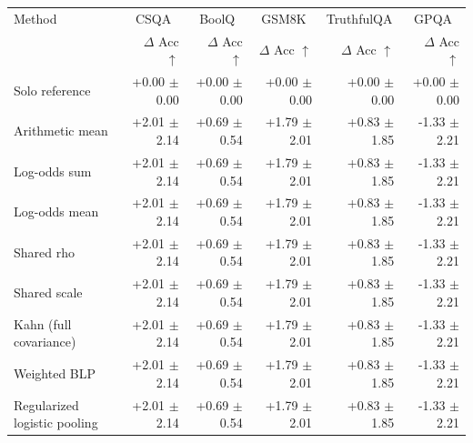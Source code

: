 \begin{tabular}{lrrrrr}
\toprule
Method & \multicolumn{1}{c}{CSQA} & \multicolumn{1}{c}{BoolQ} & \multicolumn{1}{c}{GSM8K} & \multicolumn{1}{c}{TruthfulQA} & \multicolumn{1}{c}{GPQA} \\
 & $\Delta$ Acc $\uparrow$ & $\Delta$ Acc $\uparrow$ & $\Delta$ Acc $\uparrow$ & $\Delta$ Acc $\uparrow$ & $\Delta$ Acc $\uparrow$ \\
\midrule
Solo reference & +0.00 {\scriptsize $\pm$ 0.00} & +0.00 {\scriptsize $\pm$ 0.00} & +0.00 {\scriptsize $\pm$ 0.00} & +0.00 {\scriptsize $\pm$ 0.00} & +0.00 {\scriptsize $\pm$ 0.00} \\
Arithmetic mean & +2.01 {\scriptsize $\pm$ 2.14} & +0.69 {\scriptsize $\pm$ 0.54} & +1.79 {\scriptsize $\pm$ 2.01} & +0.83 {\scriptsize $\pm$ 1.85} & -1.33 {\scriptsize $\pm$ 2.21} \\
Log-odds sum & +2.01 {\scriptsize $\pm$ 2.14} & +0.69 {\scriptsize $\pm$ 0.54} & +1.79 {\scriptsize $\pm$ 2.01} & +0.83 {\scriptsize $\pm$ 1.85} & -1.33 {\scriptsize $\pm$ 2.21} \\
Log-odds mean & +2.01 {\scriptsize $\pm$ 2.14} & +0.69 {\scriptsize $\pm$ 0.54} & +1.79 {\scriptsize $\pm$ 2.01} & +0.83 {\scriptsize $\pm$ 1.85} & -1.33 {\scriptsize $\pm$ 2.21} \\
Shared rho & +2.01 {\scriptsize $\pm$ 2.14} & +0.69 {\scriptsize $\pm$ 0.54} & +1.79 {\scriptsize $\pm$ 2.01} & +0.83 {\scriptsize $\pm$ 1.85} & -1.33 {\scriptsize $\pm$ 2.21} \\
Shared scale & +2.01 {\scriptsize $\pm$ 2.14} & +0.69 {\scriptsize $\pm$ 0.54} & +1.79 {\scriptsize $\pm$ 2.01} & +0.83 {\scriptsize $\pm$ 1.85} & -1.33 {\scriptsize $\pm$ 2.21} \\
Kahn (full covariance) & +2.01 {\scriptsize $\pm$ 2.14} & +0.69 {\scriptsize $\pm$ 0.54} & +1.79 {\scriptsize $\pm$ 2.01} & +0.83 {\scriptsize $\pm$ 1.85} & -1.33 {\scriptsize $\pm$ 2.21} \\
Weighted BLP & +2.01 {\scriptsize $\pm$ 2.14} & +0.69 {\scriptsize $\pm$ 0.54} & +1.79 {\scriptsize $\pm$ 2.01} & +0.83 {\scriptsize $\pm$ 1.85} & -1.33 {\scriptsize $\pm$ 2.21} \\
Regularized logistic pooling & +2.01 {\scriptsize $\pm$ 2.14} & +0.69 {\scriptsize $\pm$ 0.54} & +1.79 {\scriptsize $\pm$ 2.01} & +0.83 {\scriptsize $\pm$ 1.85} & -1.33 {\scriptsize $\pm$ 2.21} \\

\end{tabular}
